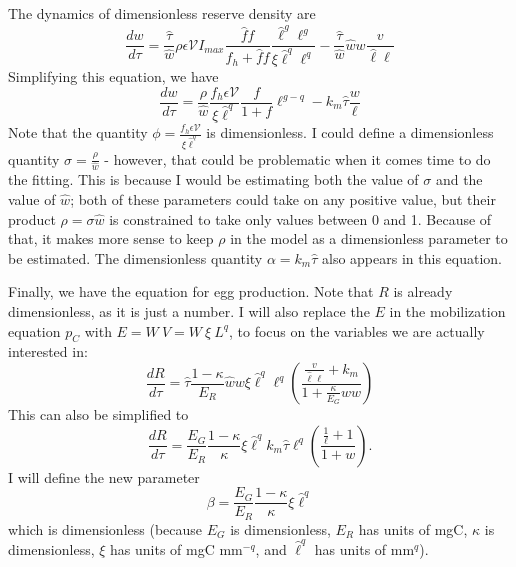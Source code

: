 \documentclass[12pt,reqno,final,pdftex]{amsart}\usepackage[]{graphicx}\usepackage[]{color}
\theoremstyle{plain}
\numberwithin{equation}{part}
\begin{document}
The dynamics of dimensionless reserve density are
\begin{equation}
\frac{dw}{d\tau} = \frac{\hat{\tau}}{\hat{w}} \rho \epsilon \mathcal{V} I_{max} \frac{\hat{f}f}{f_h+\hat{f}f}\frac{\hat{\ell}^g\ell^g}{\xi\hat{\ell}^q\ell^q} - \frac{\hat{\tau}}{\hat{w}}\hat{w}w\frac{v}{\hat{\ell}\ell}
\end{equation}
Simplifying this equation, we have
\begin{equation}
\frac{dw}{d\tau} = \frac{\rho}{\hat{w}}\frac{f_h \epsilon \mathcal{V}}{\xi \hat{\ell}^q}\frac{f}{1+f}\ell^{g-q}-k_m\hat{\tau} \frac{w}{\ell}
\end{equation}
Note that the quantity $\phi=\frac{f_h \epsilon \mathcal{V}}{\xi \hat{\ell}^q}$ is dimensionless.
I could define a dimensionless quantity $\sigma = \frac{\rho}{\hat{w}}$ - however, that could be problematic when it comes time to do the fitting.
This is because I would be estimating both the value of $\sigma$ and the value of $\hat{w}$; both of these parameters could take on any positive value, but their product $\rho = \sigma \hat{w}$ is constrained to take only values between 0 and 1.
Because of that, it makes more sense to keep $\rho$ in the model as a dimensionless parameter to be estimated.
The dimensionless quantity $\alpha=k_m\hat{\tau}$ also appears in this equation.

Finally, we have the equation for egg production.
Note that $R$ is already dimensionless, as it is just a number.
I will also replace the $E$ in the mobilization equation $p_C$ with $E=W~V=W~\xi~L^q$, to focus on the variables we are actually interested in:
\begin{equation*}
\frac{dR}{d\tau} = \hat{\tau} \frac{1-\kappa}{E_R} \hat{w}w \xi \hat{\ell}^q\ell^q \left(\frac{\frac{v}{\hat{\ell}\ell} + k_m}{1 + \frac{\kappa}{E_G}\hat{w}w}\right)
\end{equation*}
This can also be simplified to
\begin{equation}
\frac{dR}{d\tau} = \frac{E_G}{E_R}\frac{1-\kappa}{\kappa}\xi\hat{\ell}^q k_m\hat{\tau} \ell^q \left(\frac{\frac{1}{\ell}+1}{1+w}\right).
\end{equation}
I will define the new parameter
\begin{equation}
\beta = \frac{E_G}{E_R}\frac{1-\kappa}{\kappa}\xi\hat{\ell}^q
\end{equation}
which is dimensionless (because $E_G$ is dimensionless, $E_R$ has units of mgC, $\kappa$ is dimensionless, $\xi$ has units of mgC mm$^{-q}$, and $\hat{\ell}^q$ has units of mm$^q$).
\end{document}
